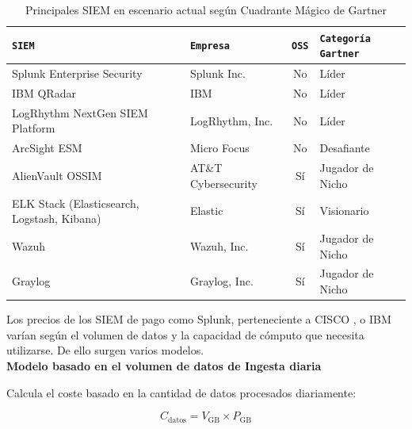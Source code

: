 \begin{table}[h]
    \centering
    \footnotesize
    \begin{tabularx}{\textwidth}{|>{\hsize=0.8\hsize\RaggedRight\arraybackslash}X|>{\hsize=1.2\hsize\RaggedRight\arraybackslash}X|>{\Centering\arraybackslash}c|>{\hsize=1\hsize\RaggedRight\arraybackslash}X|}
        \hline
        \rowcolor{graylight}\texttt{\gls{SIEM}} & \texttt{Empresa} & \texttt{\gls{OSS}} & \texttt{Categoría Gartner} \\
        \hline
        Splunk Enterprise Security & Splunk Inc. & No & Líder \\
        \hline
        \gls{IBM} QRadar & \gls{IBM} & No & Líder \\
        \hline
        LogRhythm NextGen SIEM Platform & LogRhythm, Inc. & No & Líder \\
        \hline
        ArcSight \gls{ESM} & Micro Focus & No & Desafiante \\
        \hline
        AlienVault \gls{OSSIM} & AT\&T Cybersecurity & Sí & Jugador de Nicho \\
        \hline
        \gls{ELK} Stack (Elasticsearch, Logstash, Kibana) & Elastic & Sí & Visionario \\
        \hline
        Wazuh & Wazuh, Inc. & Sí & Jugador de Nicho \\
        \hline
        Graylog & Graylog, Inc. & Sí & Jugador de Nicho \\
        \hline
    \end{tabularx}
    \caption{Principales SIEM en escenario actual según Cuadrante Mágico de Gartner \cite{GartnerSIEM2024}}
    \label{tab:siem_gartner}
\end{table}

Los precios de los \gls{SIEM} de pago como Splunk, perteneciente a CISCO \cite{cisco},  o \gls{IBM} varían según el volumen de datos y la capacidad de cómputo que necesita utilizarse. De ello surgen varios modelos. \\

\textbf{Modelo basado en el volumen de datos de Ingesta diaria}

Calcula el coste basado en la cantidad de datos procesados diariamente: 

\vspace{-0.3cm}

\begin{equation}
    C_{\text{datos}} = V_{\text{GB}} \times P_{\text{GB}}
\end{equation}

